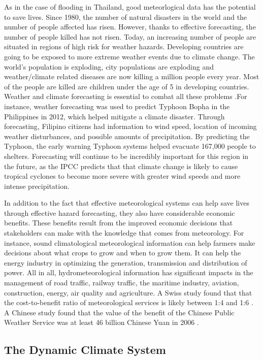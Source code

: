 As in the case of flooding in Thailand, good meteorlogical data has the potential to save lives. Since 1980, the number of natural disasters in the world and the number of people affected has risen. However, thanks to effective forecasting, the number of people killed has not risen. Today, an increasing number of people are situated in regions of high risk for weather hazards. Developing countries are going to be exposed to more extreme weather events due to climate change. The world's population is exploding, city populations are exploding and weather/climate related diseases are now killing a million people every year. Most of the people are killed are children under the age of 5 in developing countries. Weather and climate forecasting is essential to combat all these problems \citep{preparedness}.For instance, weather forecasting was used to predict Typhoon Bopha in the Philippines in 2012, which helped mitigate a climate disaster. Through forecasting, Filipino citizens had information to wind speed, location of incoming weather disturbances, and possible amounts of precipitation. By predicting the Typhoon, the early warning Typhoon systems helped evacuate 167,000 people to shelters. Forecasting will continue to be incredibly important for this region in the future, as the IPCC predicts that that climate change is likely to cause tropical cyclones to become more severe with greater wind speeds and more intense precipitation.\citep{typhoon} 

In addition to the fact that effective meteorological systems can help save lives through effective hazard forecasting, they also have considerable economic benefits. These benefits result from the improved economic decisions that stakeholders can make with the knowledge that comes from meteorology. For instance, sound climatological meteorological information can help farmers make decisions about what crops to grow and when to grow them. It can help the energy industry in optimizing the generation, transmission and distribution of power. All in all, hydrometeorological information has significant impacts in the management of road traffic, railway traffic, the maritime industry, aviation, construction, energy, air quality and agriculture. A Swiss study found that that the cost-to-benefit ratio of meteorological services is likely between 1:4 and 1:6 \citep{swissmeteo}. A Chinese study found that the value of the benefit of the Chinese Public Weather Service was at least 46 billion Chinese Yuan in 2006 \citep{chineseservice}. 

\subsection{The Dynamic Climate System}

